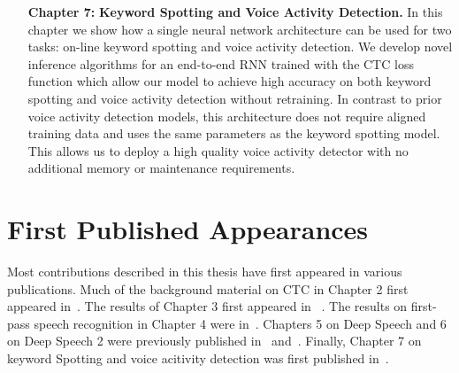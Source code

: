 \begin{itemize}
    \item [{\bf Chapter 7:}]{\bf Keyword Spotting and Voice Activity
        Detection.} In this chapter we show how a single neural network
        architecture can be used for two tasks: on-line keyword spotting and
        voice activity detection. We develop novel inference algorithms for an
        end-to-end RNN trained with the CTC loss function which allow our model
        to achieve high accuracy on both keyword spotting and voice activity
        detection without retraining. In contrast to prior voice activity
        detection models, this architecture does not require aligned training
        data and uses the same parameters as the keyword spotting model. This
        allows us to deploy a high quality voice activity detector with no
        additional memory or maintenance requirements.

\end{itemize}

\section{First Published Appearances}
Most contributions described in this thesis have first appeared in various
publications. Much of the background material on CTC in Chapter 2 first
appeared in~\cite{rajpurkar2017}. The results of Chapter 3 first appeared in
~\cite{hannun2017sequence}. The results on first-pass speech recognition in
Chapter 4 were in~\cite{hannun2014firstpass}. Chapters 5 on Deep Speech and 6
on Deep Speech 2 were previously published in~\cite{hannun2014deepspeech}
and~\cite{amodei2016deep}. Finally, Chapter 7 on keyword Spotting and voice
acitivity detection was first published in~\cite{lengerich2016}.
